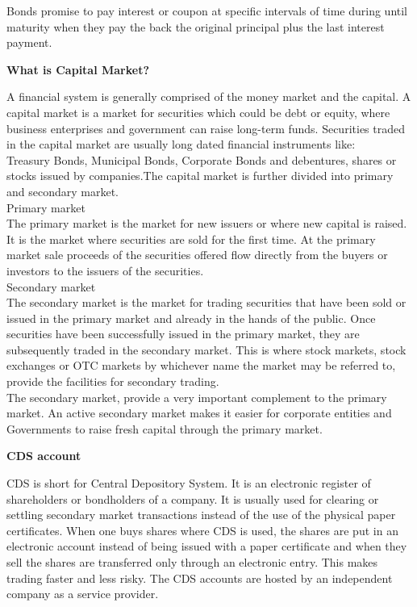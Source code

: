 \documentclass{article}
\begin{document}
\begin{titlepage}
\begin{titlepage}
\begin{flushleft}
\begin{flushleft}
Bonds promise to pay interest or coupon at specific intervals of time during until maturity when they pay the back the original principal plus the last interest payment.
\vspace{0.2cm}

\textbf{What is Capital Market?}
\vspace{0.2cm}

A financial system is generally comprised of the money market and the capital. A capital market is a market for securities which could be debt or equity, where business enterprises and government can raise long-term funds. Securities traded in the capital market are usually long dated financial instruments like:
\\

Treasury Bonds, Municipal Bonds, Corporate Bonds and debentures, shares or stocks issued by companies.The capital market is further divided into primary and secondary market.
\\

Primary market
\\

The primary market is the market for new issuers or where new capital is raised. It is the market where securities are sold for the first time. At the primary market sale proceeds of the securities offered flow directly from the buyers or investors to the issuers of the securities.
\\

Secondary market
\\

The secondary market is the market for trading securities that have been sold or issued in the primary market and already in the hands of the public. Once securities have been successfully issued in the primary market, they are subsequently traded in the secondary market. This is where stock markets, stock exchanges or OTC markets by whichever name the market may be referred to, provide the facilities for secondary trading.
\\

The secondary market, provide a very important complement to the primary market. An active secondary market makes it easier for corporate entities and Governments to raise fresh capital through the primary market.
\vspace{0.2cm}

\textbf{CDS account} 
\vspace{0.2cm}

CDS is short for Central Depository System. It is an electronic register of shareholders or bondholders of a company. It is usually used for clearing or settling secondary market transactions instead of the use of the physical paper certificates. When one buys shares where CDS is used, the shares are put in an electronic account instead of being issued with a paper certificate and when they sell the shares are transferred only through an electronic entry. This makes trading faster and less risky. The CDS accounts are hosted by an independent company as a service provider.
\vspace{2cm}



\end{flushleft}
\end{flushleft}
\end{titlepage}
\end{titlepage}
\end{document}
